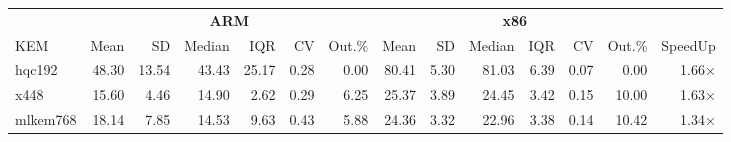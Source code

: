 \begin{table}[!ht]
\centering
\begin{tabular}{l|rrrrrr|rrrrrr|r}
\toprule
& \multicolumn{6}{c}{\bfseries ARM} & \multicolumn{6}{c}{\bfseries x86} & \\
\cmidrule(lr){2-7} \cmidrule(lr){8-13}
KEM & Mean & SD & Median & IQR & CV & Out.\% & Mean & SD & Median & IQR & CV & Out.\% & SpeedUp \\
\midrule
hqc192 & 48.30 & 13.54 & 43.43 & 25.17 & 0.28 & 0.00 & 80.41 & 5.30 & 81.03 & 6.39 & 0.07 & 0.00 & 1.66× \\
x448 & 15.60 & 4.46 & 14.90 & 2.62 & 0.29 & 6.25 & 25.37 & 3.89 & 24.45 & 3.42 & 0.15 & 10.00 & 1.63× \\
mlkem768 & 18.14 & 7.85 & 14.53 & 9.63 & 0.43 & 5.88 & 24.36 & 3.32 & 22.96 & 3.38 & 0.14 & 10.42 & 1.34× \\
\bottomrule
\end{tabular}
\end{table}
